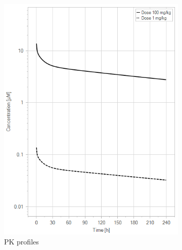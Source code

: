 \documentclass[fleqn,10pt]{physiome}
\begin{document}
\begin{figure}[htb]\centering
    \begin{subfigure}{0.49\textwidth}
        \includegraphics[width=\textwidth]{pl1.png}
        \caption{PK profiles}
        \label{fig:1a}
    \end{subfigure}
    \hfill
    \begin{subfigure}{0.49\textwidth}

\end{subfigure}
\end{figure}
\end{document}

